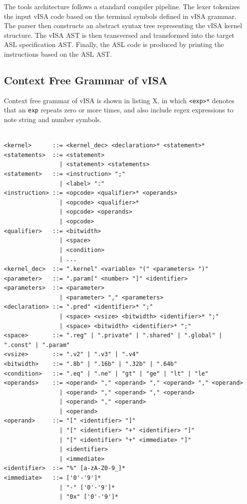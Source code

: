 The tools architecture follows a standard compiler pipeline. The lexer
tokenizes the input vISA code based on the terminal symbols defined in vISA
grammar. The parser then constructs an abstract syntax tree representing the
vISA kernel structure. The vISA AST is then transversed and transformed into
the target ASL specification AST. Finally, the ASL code is produced by printing
the instructions based on the ASL AST.

\subsection{Context Free Grammar of vISA}

Context free grammar of vISA is shown in listing X, in which \lstinline{<exp>*}
denotes that an \lstinline{exp} repeats zero or more times, and also include
regex expressions to note string and number symbols.
\begin{center}
\begin{lstlisting}[numbers=none]

<kernel>      ::= <kernel_dec> <declaration>* <statement>*
<statements>  ::= <statement>
                | <statement> <statements>
<statement>   ::= <instruction> ";"
                | <label> ":"
<instruction> ::= <opcode> <qualifier>* <operands>
                | <opcode> <qualifier>*
                | <opcode> <operands>
                | <opcode>
<qualifier>   ::= <bitwidth>
                | <space>
                | <condition>
                | ...
<kernel_dec>  ::= ".kernel" <variable> "(" <parameters> ")"
<parameter>   ::= ".param[" <number> "]" <identifier>
<parameters>  ::= <parameter>
                | <parameter> "," <parameters>
<declaration> ::= ".pred" <identifier>* ";"
                | <space> <vsize> <bitwidth> <identifier>* ";"
                | <space> <bitwidth> <identifier>* ";"
<space>       ::= ".reg" | ".private" | ".shared" | ".global" | ".const" | ".param" 
<vsize>       ::= ".v2" | ".v3" | ".v4"
<bitwidth>    ::= ".8b" | ".16b" | ".32b" | ".64b"
<condition>   ::= ".eq" | ".ne" | "gt" | "ge" | "lt" | "le"
<operands>    ::= <operand> "," <operand> "," <operand> "," <operand>
                | <operand> "," <operand> "," <operand> 
                | <operand> "," <operand>
                | <operand>
<operand>     ::= "[" <identifier> "]"
                | "[" <identifier> "+" <identifier> "]"
                | "[" <identifier> "+" <immediate> "]"
                | <identifier>
                | <immediate>
<identifier>  ::= "%" [a-zA-Z0-9_]*
<immediate>   ::= ['0'-'9']*
                | "-" ['0'-'9']*
                | "0x" ['0'-'9']*

\end{lstlisting}
\end{center}

